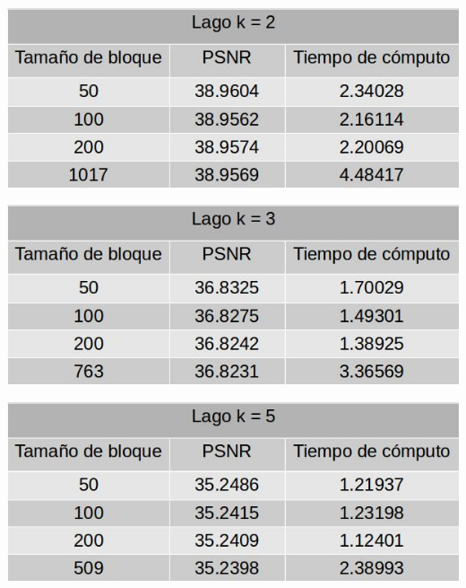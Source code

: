 \documentclass[a4paper]{article}
\begin{document}
\centerline{
\includegraphics[scale=0.5]{imagenes/lagok2Tabla.jpg}
}
\vspace{1cm}

\centerline{
\includegraphics[scale=0.5]{imagenes/lagok3Tabla.jpg}
}
\vspace{1cm}

\centerline{
\includegraphics[scale=0.5]{imagenes/lagok5Tabla.jpg}
}
\vspace{1cm}
\end{document}
